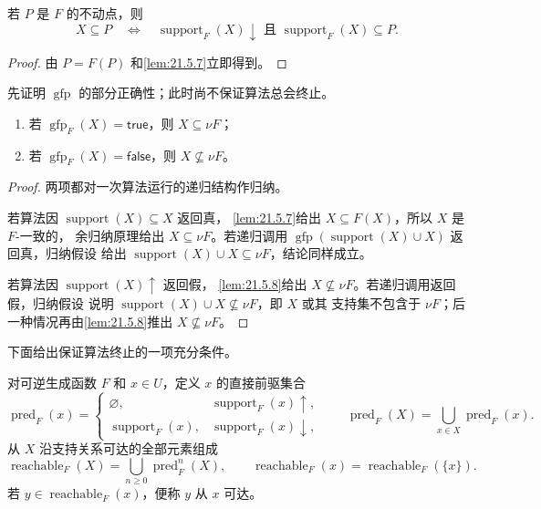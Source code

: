 \begin{lemma}
\label{lem:21.5.8}
若 \(P\) 是 \(F\) 的不动点，则
\[
X\subseteq P\quad\Longleftrightarrow\quad
\operatorname{support}_F(X)\downarrow
\text{ 且 }\operatorname{support}_F(X)\subseteq P.
\]
\end{lemma}

\begin{proof}
由 \(P=F(P)\) 和\cref{lem:21.5.7}立即得到。
\end{proof}

先证明 \(\operatorname{gfp}\) 的部分正确性；此时尚不保证算法总会终止。

\taplstatementliststart
\begin{theorem}
\label{thm:21.5.9}
\taplstatementlistbreak
\begin{enumerate}
  \item 若 \(\operatorname{gfp}_F(X)=\mathsf{true}\)，则 \(X\subseteq\nu F\)；
  \item 若 \(\operatorname{gfp}_F(X)=\mathsf{false}\)，则 \(X\not\subseteq\nu F\)。
\end{enumerate}
\end{theorem}

\begin{proof}
两项都对一次算法运行的递归结构作归纳。

若算法因 \(\operatorname{support}(X)\subseteq X\) 返回真，
\cref{lem:21.5.7}给出 \(X\subseteq F(X)\)，所以 \(X\) 是 \(F\)-一致的，
余归纳原理给出 \(X\subseteq\nu F\)。若递归调用
\(\operatorname{gfp}(\operatorname{support}(X)\cup X)\) 返回真，归纳假设
给出 \(\operatorname{support}(X)\cup X\subseteq\nu F\)，结论同样成立。

若算法因 \(\operatorname{support}(X)\uparrow\) 返回假，
\cref{lem:21.5.8}给出 \(X\not\subseteq\nu F\)。若递归调用返回假，归纳假设
说明 \(\operatorname{support}(X)\cup X\not\subseteq\nu F\)，即 \(X\) 或其
支持集不包含于 \(\nu F\)；后一种情况再由\cref{lem:21.5.8}推出
\(X\not\subseteq\nu F\)。
\end{proof}

下面给出保证算法终止的一项充分条件。

\begin{definition}
\label{def:21.5.10}
对可逆生成函数 \(F\) 和 \(x\in U\)，定义 \(x\) 的直接前驱集合
\[
\operatorname{pred}_F(x)=
\begin{cases}
\varnothing,&\operatorname{support}_F(x)\uparrow,\\
\operatorname{support}_F(x),&\operatorname{support}_F(x)\downarrow,
\end{cases}
\qquad
\operatorname{pred}_F(X)=\bigcup_{x\in X}\operatorname{pred}_F(x).
\]
从 \(X\) 沿支持关系可达的全部元素组成
\[
\operatorname{reachable}_F(X)=
\bigcup_{n\ge0}\operatorname{pred}_F^n(X),
\qquad
\operatorname{reachable}_F(x)=\operatorname{reachable}_F(\{x\}).
\]
若 \(y\in\operatorname{reachable}_F(x)\)，便称 \(y\) 从 \(x\) 可达。
\end{definition}

